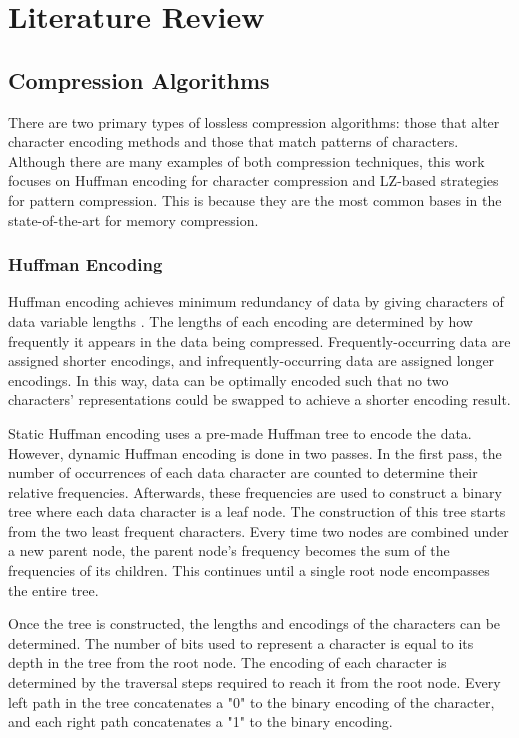 \documentclass[doublespace,nopageskip]{VTthesis}
\begin{document}
\chapter{Literature Review} \label{ch:literature_review}
\section{Compression Algorithms}\label{se:compression_algorithms}
There are two primary types of lossless compression algorithms: those that alter character encoding methods and those that match patterns of characters. Although there are many examples of both compression techniques, this work focuses on Huffman encoding for character compression and LZ-based strategies for pattern compression. This is because they are the most common bases in the state-of-the-art for memory compression.

\subsection{Huffman Encoding}\label{ss:huffman_encoding}
Huffman encoding achieves minimum redundancy of data by giving characters of data variable lengths \cite{huffman}. The lengths of each encoding are determined by how frequently it appears in the data being compressed. Frequently-occurring data are assigned shorter encodings, and infrequently-occurring data are assigned longer encodings. In this way, data can be optimally encoded such that no two characters' representations could be swapped to achieve a shorter encoding result. 

Static Huffman encoding uses a pre-made Huffman tree to encode the data. However, dynamic Huffman encoding is done in two passes. In the first pass, the number of occurrences of each data character are counted to determine their relative frequencies. Afterwards, these frequencies are used to construct a binary tree where each data character is a leaf node. The construction of this tree starts from the two least frequent characters. Every time two nodes are combined under a new parent node, the parent node's frequency becomes the sum of the frequencies of its children. This continues until a single root node encompasses the entire tree.

Once the tree is constructed, the lengths and encodings of the characters can be determined. The number of bits used to represent a character is equal to its depth in the tree from the root node. The encoding of each character is determined by the traversal steps required to reach it from the root node. Every left path in the tree concatenates a "0" to the binary encoding of the character, and each right path concatenates a "1" to the binary encoding.
\end{document}
